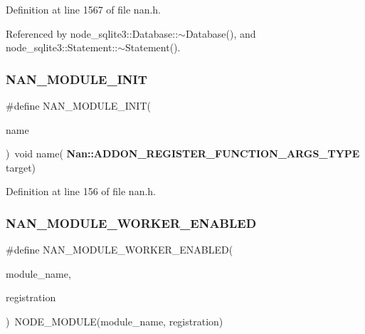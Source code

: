 Definition at line 1567 of file nan.\+h.



Referenced by node\+\_\+sqlite3\+::\+Database\+::$\sim$\+Database(), and node\+\_\+sqlite3\+::\+Statement\+::$\sim$\+Statement().

\mbox{\label{nan_8h_a968f3ecf6a1fe1e026cb29a06501ac4b}} 
\subsubsection{N\+A\+N\+\_\+\+M\+O\+D\+U\+L\+E\+\_\+\+I\+N\+IT}
{\footnotesize\ttfamily \#define N\+A\+N\+\_\+\+M\+O\+D\+U\+L\+E\+\_\+\+I\+N\+IT(\begin{DoxyParamCaption}\item[{}]{name }\end{DoxyParamCaption})~void name(\textbf{ Nan\+::\+A\+D\+D\+O\+N\+\_\+\+R\+E\+G\+I\+S\+T\+E\+R\+\_\+\+F\+U\+N\+C\+T\+I\+O\+N\+\_\+\+A\+R\+G\+S\+\_\+\+T\+Y\+PE} target)}



Definition at line 156 of file nan.\+h.

\mbox{\label{nan_8h_ad59e6128c501828bd3d567f17bed8ac5}} 
\subsubsection{N\+A\+N\+\_\+\+M\+O\+D\+U\+L\+E\+\_\+\+W\+O\+R\+K\+E\+R\+\_\+\+E\+N\+A\+B\+L\+ED}
{\footnotesize\ttfamily \#define N\+A\+N\+\_\+\+M\+O\+D\+U\+L\+E\+\_\+\+W\+O\+R\+K\+E\+R\+\_\+\+E\+N\+A\+B\+L\+ED(\begin{DoxyParamCaption}\item[{}]{module\+\_\+name,  }\item[{}]{registration }\end{DoxyParamCaption})~N\+O\+D\+E\+\_\+\+M\+O\+D\+U\+LE(module\+\_\+name, registration)}



